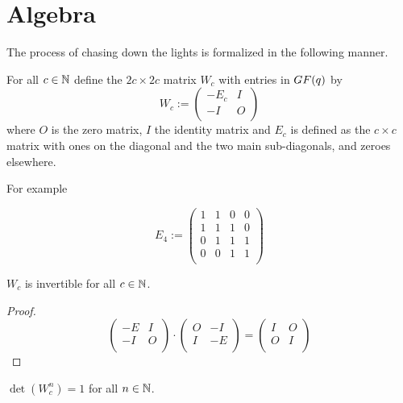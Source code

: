 \section{Algebra}

The process of chasing down the lights is formalized in the following
manner.

For all $c\in\mathbb{N}$ define the $2c\times 2c$ matrix
$W_{c}$ with entries in $GF(q)$ by
\[
W_{c} := \left(
\begin{array}{cc}
  -E_{c} & I \\
  -I    & O \\
\end{array}
\right)
\]
where $O$ is the zero matrix, $I$ the identity matrix and $E_{c}$ is defined
as the $c\times c$ matrix with ones on the diagonal and the two main
sub-diagonals, and zeroes elsewhere.

For example

\[
E_{4} := \left(
\begin{array}{cccc}
  1 & 1 & 0 & 0 \\
  1 & 1 & 1 & 0 \\
  0 & 1 & 1 & 1 \\
  0 & 0 & 1 & 1 \\
\end{array}
\right)
\]

\begin{lemma}
  $W_{c}$ is invertible for all $c\in\mathbb{N}$.
\end{lemma}

\begin{proof}
  \[
  \left(
  \begin{array}{cc}
    -E & I \\
    -I & O \\
  \end{array}
  \right)
  \cdot
  \left(
  \begin{array}{cc}
    O & -I  \\
    I & -E \\
  \end{array}
  \right)
  =
  \left(
  \begin{array}{cc}
    I & O \\
    O & I \\
  \end{array}
  \right)
  \]
\end{proof}


\begin{lemma}
  $\det(W_{c}^{n}) = 1$ for all $n\in\mathbb{N}$.
\end{lemma}


